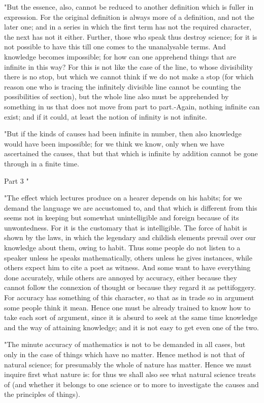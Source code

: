 "But the essence, also, cannot be reduced to another definition which
is fuller in expression. For the original definition is always more
of a definition, and not the later one; and in a series in which the
first term has not the required character, the next has not it either.
Further, those who speak thus destroy science; for it is not possible
to have this till one comes to the unanalysable terms. And knowledge
becomes impossible; for how can one apprehend things that are infinite
in this way? For this is not like the case of the line, to whose divisibility
there is no stop, but which we cannot think if we do not make a stop
(for which reason one who is tracing the infinitely divisible line
cannot be counting the possibilities of section), but the whole line
also must be apprehended by something in us that does not move from
part to part.-Again, nothing infinite can exist; and if it could,
at least the notion of infinity is not infinite. 

"But if the kinds of causes had been infinite in number, then also
knowledge would have been impossible; for we think we know, only when
we have ascertained the causes, that but that which is infinite by
addition cannot be gone through in a finite time. 

Part 3 "

"The effect which lectures produce on a hearer depends on his habits;
for we demand the language we are accustomed to, and that which is
different from this seems not in keeping but somewhat unintelligible
and foreign because of its unwontedness. For it is the customary that
is intelligible. The force of habit is shown by the laws, in which
the legendary and childish elements prevail over our knowledge about
them, owing to habit. Thus some people do not listen to a speaker
unless he speaks mathematically, others unless he gives instances,
while others expect him to cite a poet as witness. And some want to
have everything done accurately, while others are annoyed by accuracy,
either because they cannot follow the connexion of thought or because
they regard it as pettifoggery. For accuracy has something of this
character, so that as in trade so in argument some people think it
mean. Hence one must be already trained to know how to take each sort
of argument, since it is absurd to seek at the same time knowledge
and the way of attaining knowledge; and it is not easy to get even
one of the two. 

"The minute accuracy of mathematics is not to be demanded in all cases,
but only in the case of things which have no matter. Hence method
is not that of natural science; for presumably the whole of nature
has matter. Hence we must inquire first what nature is: for thus we
shall also see what natural science treats of (and whether it belongs
to one science or to more to investigate the causes and the principles
of things). 

